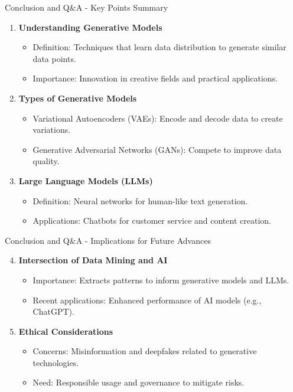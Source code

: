 \documentclass[aspectratio=169]{beamer}
\begin{document}
\begin{frame}[fragile]{Conclusion and Q\&A - Key Points Summary}
    \begin{enumerate}
        \item \textbf{Understanding Generative Models}
            \begin{itemize}
                \item Definition: Techniques that learn data distribution to generate similar data points.
                \item Importance: Innovation in creative fields and practical applications.
            \end{itemize}
            
        \item \textbf{Types of Generative Models}
            \begin{itemize}
                \item Variational Autoencoders (VAEs): Encode and decode data to create variations.
                \item Generative Adversarial Networks (GANs): Compete to improve data quality.
            \end{itemize}

        \item \textbf{Large Language Models (LLMs)}
            \begin{itemize}
                \item Definition: Neural networks for human-like text generation.
                \item Applications: Chatbots for customer service and content creation.
            \end{itemize}
    \end{enumerate}
\end{frame}

\begin{frame}[fragile]{Conclusion and Q\&A - Implications for Future Advances}
    \begin{enumerate}
        \setcounter{enumi}{3} %
        \item \textbf{Intersection of Data Mining and AI}
            \begin{itemize}
                \item Importance: Extracts patterns to inform generative models and LLMs.
                \item Recent applications: Enhanced performance of AI models (e.g., ChatGPT).
            \end{itemize}

        \item \textbf{Ethical Considerations}
            \begin{itemize}
                \item Concerns: Misinformation and deepfakes related to generative technologies.
                \item Need: Responsible usage and governance to mitigate risks.
            \end{itemize}
    \end{enumerate}
\end{frame}
\end{document}
